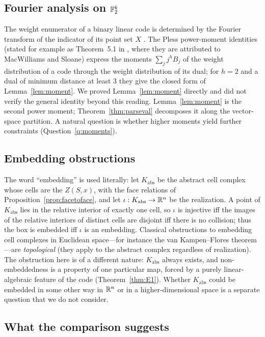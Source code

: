 \subsection{Fourier analysis on \texorpdfstring{$\mathbb F_2^k$}{F2\^{}k}}

The weight enumerator of a binary linear code is determined by the Fourier transform of the indicator of its point set $X$ \cite{MacWilliamsSloane1977,Terras1999,ODonnell2014}. The Pless power-moment identities (stated for example as Theorem~5.1 in \cite{Kim2009}, where they are attributed to MacWilliams and Sloane) express the moments $\sum_jj^hB_j$ of the weight distribution of a code through the weight distribution of its dual; for $h=2$ and a dual of minimum distance at least $3$ they give the closed form of Lemma~\ref{lem:moment}. We proved Lemma~\ref{lem:moment} directly and did not verify the general identity beyond this reading. Lemma~\ref{lem:moment} is the second power moment; Theorem~\ref{thm:parseval} decomposes it along the vector-space partition. A natural question is whether higher moments yield further constraints (Question~\ref{q:moments}).

\subsection{Embedding obstructions}

The word ``embedding'' is used literally: let $K_{\mathrm{abs}}$ be the abstract cell complex whose cells are the $Z(S,x)$, with the face relations of Proposition~\ref{prop:facetoface}, and let $\iota:K_{\mathrm{abs}}\to\mathbb R^n$ be the realization. A point of $K_{\mathrm{abs}}$ lies in the relative interior of exactly one cell, so $\iota$ is injective iff the images of the relative interiors of distinct cells are disjoint iff there is no collision; thus the box is embedded iff $\iota$ is an embedding. Classical obstructions to embedding cell complexes in Euclidean space---for instance the van Kampen--Flores theorem \cite{Matousek2003}---are \emph{topological} (they apply to the abstract complex regardless of realization). The obstruction here is of a different nature: $K_{\mathrm{abs}}$ always exists, and non-embeddedness is a property of one particular map, forced by a purely linear-algebraic feature of the code (Theorem~\ref{thm:E1}). Whether $K_{\mathrm{abs}}$ could be embedded in some other way in $\mathbb R^n$ or in a higher-dimensional space is a separate question that we do not consider.

\subsection{What the comparison suggests}

